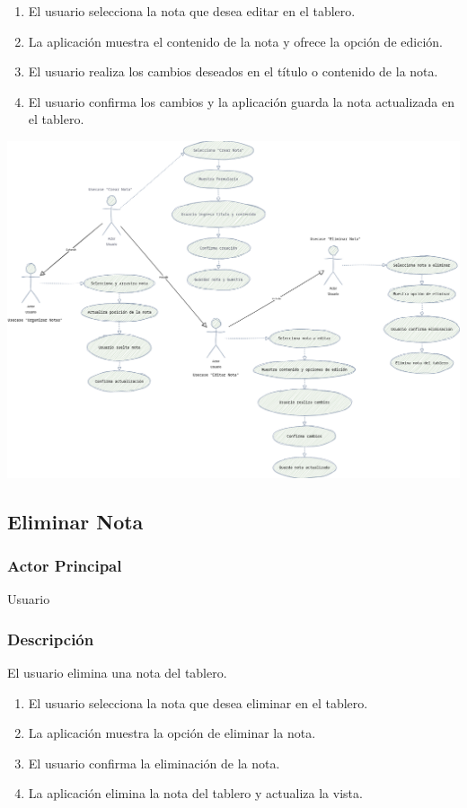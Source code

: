 \begin{enumerate}
  \item El usuario selecciona la nota que desea editar en el tablero.
  \item La aplicación muestra el contenido de la nota y ofrece la opción de edición.
  \item El usuario realiza los cambios deseados en el título o contenido de la nota.
  \item El usuario confirma los cambios y la aplicación guarda la nota actualizada en el tablero.
\end{enumerate}

\begin{center}
    \includegraphics[scale = .75]{IMA/CasosUso.drawio.png}
\end{center}

\subsection{Eliminar Nota}
\subsubsection{Actor Principal}
Usuario

\subsubsection{Descripción}
El usuario elimina una nota del tablero.

\begin{enumerate}
  \item El usuario selecciona la nota que desea eliminar en el tablero.
  \item La aplicación muestra la opción de eliminar la nota.
  \item El usuario confirma la eliminación de la nota.
  \item La aplicación elimina la nota del tablero y actualiza la vista.
\end{enumerate}

